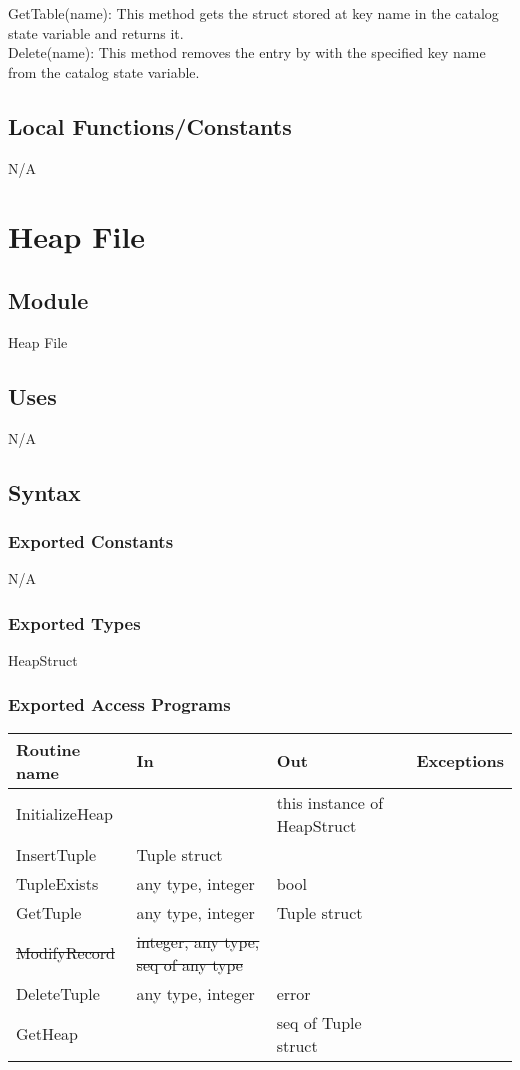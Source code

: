 \documentclass[12pt]{article}
\begin{document}
\noindent GetTable(name): This method gets the struct stored at key name in the catalog state variable and returns it.\\

\noindent Delete(name): This method removes the entry by with the specified key name from the catalog state variable.\\

\subsection{Local Functions/Constants}
N/A

\newpage

\section{Heap File}

\subsection{Module}
Heap File

\subsection{Uses}
N/A

\subsection{Syntax}
\subsubsection{Exported Constants}
N/A

\subsubsection{Exported Types}
HeapStruct

\subsubsection{Exported Access Programs}
\begin{tabular}{| l | l | l | l |}
\hline
\textbf{Routine name} & \textbf{In} & \textbf{Out} & \textbf{Exceptions}\\
\hline
InitializeHeap &  & this instance of HeapStruct & \\
{\color{red}InsertTuple} & Tuple struct & & \\
{\color{red}TupleExists} & {\color{red}any type, integer} & bool & \\
{\color{red}GetTuple} & {\color{red}any type, integer} & Tuple struct & \\
\sout{ModifyRecord} & \sout{integer, any type, seq of any type} & &\\ 
{\color{red}DeleteTuple} & {\color{red}any type, integer} & {\color{red} error} & \\
{\color{red}GetHeap} & & {\color{red} seq of Tuple struct} & \\
\hline
\end{tabular}
\end{document}
